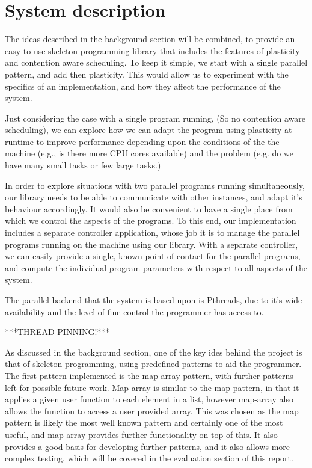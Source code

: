 \section{System description}

The ideas described in the background section will be combined, to provide an easy to use skeleton programming library that includes the features of plasticity and contention aware scheduling. To keep it simple, we start with a single parallel pattern, and add then plasticity. This would allow us to experiment with the specifics of an implementation, and how they affect the performance of the system.

Just considering the case with a single program running, (So no contention aware scheduling), we can explore how we can adapt the program using plasticity at runtime to improve performance depending upon the conditions of the the machine (e.g., is there more CPU cores available) and the problem (e.g. do we have many small tasks or few large tasks.) 

In order to explore situations with two parallel programs running simultaneously, our library needs to be able to communicate with other instances, and adapt it's behaviour accordingly. It would also be convenient to have a single place from which we control the aspects of the programs. To this end, our implementation includes a separate controller application, whose job it is to manage the parallel programs running on the machine using our library. With a separate controller, we can easily provide a single, known point of contact for the parallel programs, and compute the individual program parameters with respect to all aspects of the system.


The parallel backend that the system is based upon is Pthreads, due to it's wide availability and the level of fine control the programmer has access to.



***THREAD PINNING!***



As discussed in the background section, one of the key ides behind the project is that of skeleton programming, using predefined patterns to aid the programmer. The first pattern implemented is the map array pattern, with further patterns left for possible future work. Map-array is similar to the map pattern, in that it applies a given user function to each element in a list, however map-array also allows the function to access a user provided array. This was chosen as the map pattern is likely the most well known pattern and certainly one of the most useful, and map-array provides further functionality on top of this. It also provides a good basis for developing further patterns, and it also allows more complex testing, which will be covered in the evaluation section of this report.


